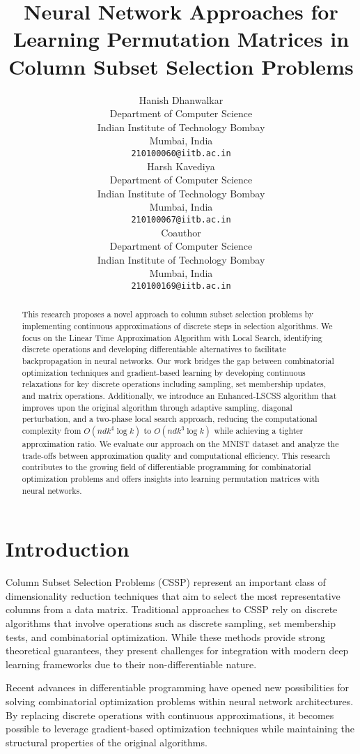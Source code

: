 \documentclass{article}
\title{Neural Network Approaches for Learning Permutation Matrices in Column Subset Selection Problems}
\author{%
  Hanish Dhanwalkar\\
  Department of Computer Science\\
  Indian Institute of Technology Bombay\\
  Mumbai, India \\
  \texttt{210100060@iitb.ac.in} \\
  \And
  Harsh Kavediya \\
  Department of Computer Science\\
  Indian Institute of Technology Bombay\\
  Mumbai, India \\
  \texttt{210100067@iitb.ac.in} \\
  \AND
  Coauthor \\
  Department of Computer Science\\
  Indian Institute of Technology Bombay\\
  Mumbai, India \\
  \texttt{210100169@iitb.ac.in} \\
}
\begin{document}
\maketitle

\begin{abstract}
This research proposes a novel approach to column subset selection problems by implementing continuous approximations of discrete steps in selection algorithms. We focus on the Linear Time Approximation Algorithm with Local Search, identifying discrete operations and developing differentiable alternatives to facilitate backpropagation in neural networks. Our work bridges the gap between combinatorial optimization techniques and gradient-based learning by developing continuous relaxations for key discrete operations including sampling, set membership updates, and matrix operations. Additionally, we introduce an Enhanced-LSCSS algorithm that improves upon the original algorithm through adaptive sampling, diagonal perturbation, and a two-phase local search approach, reducing the computational complexity from $O(ndk^4 \log k)$ to $O(ndk^3 \log k)$ while achieving a tighter approximation ratio. We evaluate our approach on the MNIST dataset and analyze the trade-offs between approximation quality and computational efficiency. This research contributes to the growing field of differentiable programming for combinatorial optimization problems and offers insights into learning permutation matrices with neural networks.
\end{abstract}

\section{Introduction}
Column Subset Selection Problems (CSSP) represent an important class of dimensionality reduction techniques that aim to select the most representative columns from a data matrix. Traditional approaches to CSSP rely on discrete algorithms that involve operations such as discrete sampling, set membership tests, and combinatorial optimization. While these methods provide strong theoretical guarantees, they present challenges for integration with modern deep learning frameworks due to their non-differentiable nature.

Recent advances in differentiable programming have opened new possibilities for solving combinatorial optimization problems within neural network architectures. By replacing discrete operations with continuous approximations, it becomes possible to leverage gradient-based optimization techniques while maintaining the structural properties of the original algorithms.
\end{document}
